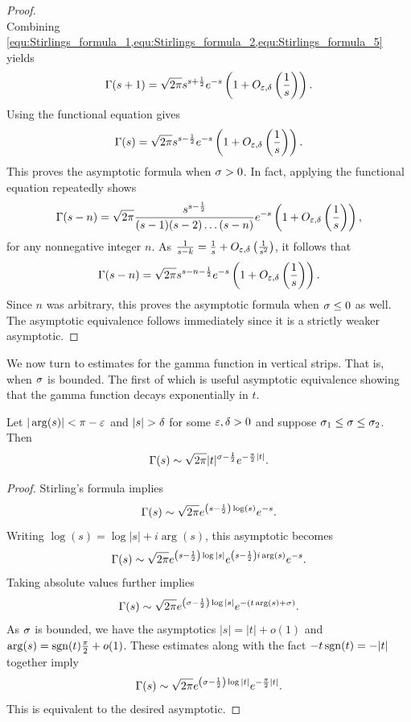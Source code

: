 \documentclass[12pt]{article}
\begin{document}
\begin{proof}
\begin{equation}
      \end{equation}
      Combining \cref{equ:Stirlings_formula_1,equ:Stirlings_formula_2,equ:Stirlings_formula_5} yields
      \[
        \Gamma(s+1) = \sqrt{2\pi}s^{s+\frac{1}{2}}e^{-s}\left(1+O_{\varepsilon,\delta}\left(\frac{1}{s}\right)\right).
      \]
      Using the functional equation gives
      \[
        \Gamma(s) = \sqrt{2\pi}s^{s-\frac{1}{2}}e^{-s}\left(1+O_{\varepsilon,\delta}\left(\frac{1}{s}\right)\right).
      \]
      This proves the asymptotic formula when \(\sigma > 0\). In fact, applying the functional equation repeatedly shows
      \[
        \Gamma(s-n) = \sqrt{2\pi}\frac{s^{s-\frac{1}{2}}}{(s-1)(s-2) \ldots (s-n)}e^{-s}\left(1+O_{\varepsilon,\delta}\left(\frac{1}{s}\right)\right),
      \]
      for any nonnegative integer \(n\). As \(\frac{1}{s-k} = \frac{1}{s}+O_{\varepsilon,\delta}\left(\frac{1}{s^{2}}\right)\), it follows that
      \[
        \Gamma(s-n) = \sqrt{2\pi}s^{s-n-\frac{1}{2}}e^{-s}\left(1+O_{\varepsilon,\delta}\left(\frac{1}{s}\right)\right).
      \]
      Since \(n\) was arbitrary, this proves the asymptotic formula when \(\sigma \le 0\) as well. The asymptotic equivalence follows immediately since it is a strictly weaker asymptotic.
    \end{proof}

    We now turn to estimates for the gamma function in vertical strips. That is, when \(\sigma\) is bounded. The first of which is useful asymptotic equivalence showing that the gamma function decays exponentially in \(t\).
    
    \begin{corollary}\label{equ:weaker_Stirling_formula_1}
      Let \(|\arg(s)| < \pi-\varepsilon\) and \(|s| > \delta\) for some \(\varepsilon,\delta > 0\) and suppose \(\sigma_{1} \le \sigma \le \sigma_{2}\). Then
      \[
        \Gamma(s) \sim \sqrt{2\pi}|t|^{\sigma-\frac{1}{2}}e^{-\frac{\pi}{2}|t|}.
      \]
    \end{corollary}
    \begin{proof}
      Stirling's formula implies
      \[
        \Gamma(s) \sim \sqrt{2\pi}e^{\left(s-\frac{1}{2}\right)\log(s)}e^{-s}.
      \]
      Writing \(\log(s) = \log|s|+i\arg(s)\), this asymptotic becomes
      \[
        \Gamma(s) \sim \sqrt{2\pi}e^{\left(s-\frac{1}{2}\right)\log|s|}e^{\left(s-\frac{1}{2}\right)i\arg(s)}e^{-s}.
      \]
      Taking absolute values further implies
      \[
        \Gamma(s) \sim \sqrt{2\pi}e^{\left(\sigma-\frac{1}{2}\right)\log|s|}e^{-(t\arg(s)+\sigma)}.
      \]
      As \(\sigma\) is bounded, we have the asymptotics \(|s| = |t|+o(1)\) and \(\arg(s) = \operatorname{\mathrm{sgn}}(t)\frac{\pi}{2}+o(1)\). These estimates along with the fact \(-t\operatorname{\mathrm{sgn}}(t) = -|t|\) together imply
      \[
        \Gamma(s) \sim \sqrt{2\pi}e^{\left(\sigma-\frac{1}{2}\right)\log|t|}e^{-\frac{\pi}{2}|t|}.
      \]
      This is equivalent to the desired asymptotic.
    \end{proof}
\end{document}
